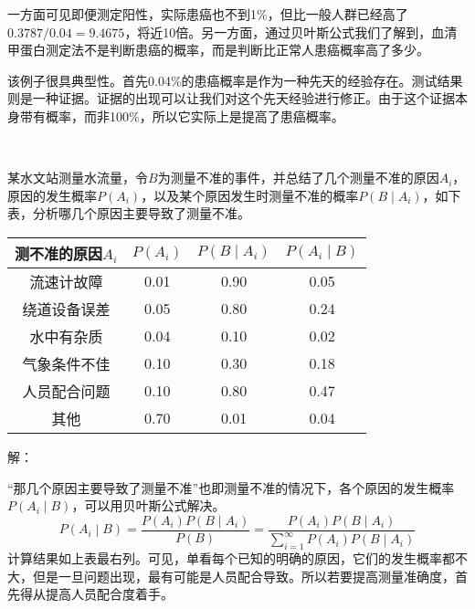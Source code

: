 一方面可见即便测定阳性，实际患癌也不到1\%，但比一般人群已经高了$0.3787/0.04=9.4675$，将近10倍。另一方面，通过贝叶斯公式我们了解到，血清甲蛋白测定法不是判断患癌的概率，而是判断比正常人患癌概率高了多少。

\begin{tcolorbox}
该例子很具典型性。首先0.04\%的患癌概率是作为一种先天的经验存在。测试结果则是一种证据。证据的出现可以让我们对这个先天经验进行修正。由于这个证据本身带有概率，而非100\%，所以它实际上是提高了患癌概率。
\end{tcolorbox}

~

\begin{example}
某水文站测量水流量，令$B$为测量不准的事件，并总结了几个测量不准的原因$A_i$，原因的发生概率$P\left( A_i \right) $，以及某个原因发生时测量不准的概率$P\left( B \middle| A_i \right) $，如下表，分析哪几个原因主要导致了测量不准。
\begin{table}[h]
    \centering
    \begin{tabular}{cccc}
        \toprule
        测不准的原因$A_i$ & $P\left( A_i \right) $ & $P\left( B \middle| A_i \right) $ & $P\left( A_i \middle| B \right) $\\
        \midrule
        流速计故障 & 0.01 & 0.90 & 0.05\\
        绕道设备误差 & 0.05 & 0.80 & 0.24\\
        水中有杂质 & 0.04 & 0.10 & 0.02\\
        气象条件不佳 & 0.10 & 0.30 & 0.18\\
        人员配合问题 & 0.10 & 0.80 & 0.47\\
        其他 & 0.70 & 0.01 & 0.04\\
        \bottomrule
    \end{tabular}
\end{table}
\end{example}

解：

“那几个原因主要导致了测量不准”也即测量不准的情况下，各个原因的发生概率$P\left( A_i \middle| B \right) $，可以用贝叶斯公式解决。
\[
P\left( A_i \middle| B \right) =\frac{P\left( A_i \right) P\left( B \middle| A_i \right)}{P\left( B \right)}=\frac{P\left( A_i \right) P\left( B \middle| A_i \right)}{\sum_{i=1}^{\infty}{P\left( A_i \right) P\left( B \middle| A_i \right)}}
\]
计算结果如上表最右列。可见，单看每个已知的明确的原因，它们的发生概率都不大，但是一旦问题出现，最有可能是人员配合导致。所以若要提高测量准确度，首先得从提高人员配合度着手。

